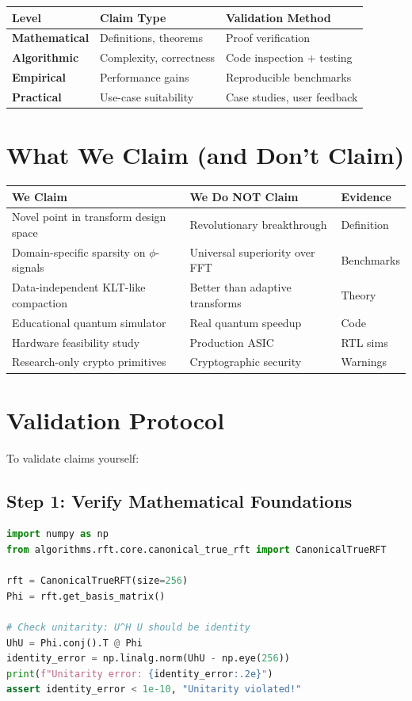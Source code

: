 \documentclass[11pt, a4paper, openany]{book}
\theoremstyle{definition}
\begin{document}
\begin{table}[h]
\centering
\begin{tabular}{@{}lll@{}}\toprule
Level & Claim Type & Validation Method \\ \midrule
\textbf{Mathematical} & Definitions, theorems & Proof verification \\
\textbf{Algorithmic} & Complexity, correctness & Code inspection + testing \\
\textbf{Empirical} & Performance gains & Reproducible benchmarks \\
\textbf{Practical} & Use-case suitability & Case studies, user feedback \\ \bottomrule
\end{tabular}
\end{table}

\section{What We Claim (and Don't Claim)}
\begin{table}[h]
\centering
\small
\begin{tabular}{@{}p{5cm}p{5cm}l@{}}\toprule
\textbf{We Claim} & \textbf{We Do NOT Claim} & \textbf{Evidence} \\ \midrule
Novel point in transform design space & Revolutionary breakthrough & Definition \\
Domain-specific sparsity on $\phi$-signals & Universal superiority over FFT & Benchmarks \\
Data-independent KLT-like compaction & Better than adaptive transforms & Theory \\
Educational quantum simulator & Real quantum speedup & Code \\
Hardware feasibility study & Production ASIC & RTL sims \\
Research-only crypto primitives & Cryptographic security & Warnings \\ \bottomrule
\end{tabular}
\end{table}

\section{Validation Protocol}
To validate claims yourself:

\subsection{Step 1: Verify Mathematical Foundations}
\begin{lstlisting}[language=Python, caption={Verify Unitarity}]
import numpy as np
from algorithms.rft.core.canonical_true_rft import CanonicalTrueRFT

rft = CanonicalTrueRFT(size=256)
Phi = rft.get_basis_matrix()

# Check unitarity: U^H U should be identity
UhU = Phi.conj().T @ Phi
identity_error = np.linalg.norm(UhU - np.eye(256))
print(f"Unitarity error: {identity_error:.2e}")
assert identity_error < 1e-10, "Unitarity violated!"
\end{lstlisting}
\end{document}
